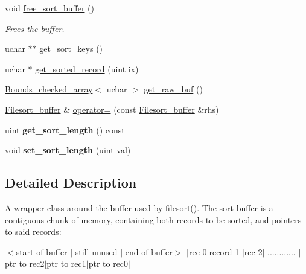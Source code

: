 \begin{DoxyCompactItemize}
\item 
\mbox{\label{classFilesort__buffer_a967d857a913b61ef3957d094ac227eca}} 
void \mbox{\hyperlink{classFilesort__buffer_a967d857a913b61ef3957d094ac227eca}{free\+\_\+sort\+\_\+buffer}} ()
\begin{DoxyCompactList}\small\item\em Frees the buffer. \end{DoxyCompactList}\item 
uchar $\ast$$\ast$ \mbox{\hyperlink{classFilesort__buffer_ab833d1ea135e1651b55087cbe923dbf5}{get\+\_\+sort\+\_\+keys}} ()
\item 
uchar $\ast$ \mbox{\hyperlink{classFilesort__buffer_aaa6a3d39db88fecaec624037485fd727}{get\+\_\+sorted\+\_\+record}} (uint ix)
\item 
\mbox{\hyperlink{classBounds__checked__array}{Bounds\+\_\+checked\+\_\+array}}$<$ uchar $>$ \mbox{\hyperlink{classFilesort__buffer_ac13e1d504a855446db9b9eb540bd69b2}{get\+\_\+raw\+\_\+buf}} ()
\item 
\mbox{\hyperlink{classFilesort__buffer}{Filesort\+\_\+buffer}} \& \mbox{\hyperlink{classFilesort__buffer_a3706c904c133aa91efa0838984053a7d}{operator=}} (const \mbox{\hyperlink{classFilesort__buffer}{Filesort\+\_\+buffer}} \&rhs)
\item 
\mbox{\label{classFilesort__buffer_a4115fea712de87218fb7576173e55625}} 
uint {\bfseries get\+\_\+sort\+\_\+length} () const
\item 
\mbox{\label{classFilesort__buffer_a3f0a1cdc26a4a5238ff5eeff9b3677fd}} 
void {\bfseries set\+\_\+sort\+\_\+length} (uint val)
\end{DoxyCompactItemize}


\subsection{Detailed Description}
A wrapper class around the buffer used by \mbox{\hyperlink{filesort_8cc_a953fde8362f86f7fb832e9a1e2c06530}{filesort()}}. The sort buffer is a contiguous chunk of memory, containing both records to be sorted, and pointers to said records\+:

$<$start of buffer $\vert$ still unused $\vert$ end of buffer$>$ $\vert$rec 0$\vert$record 1 $\vert$rec 2$\vert$ ............ $\vert$ptr to rec2$\vert$ptr to rec1$\vert$ptr to rec0$\vert$

